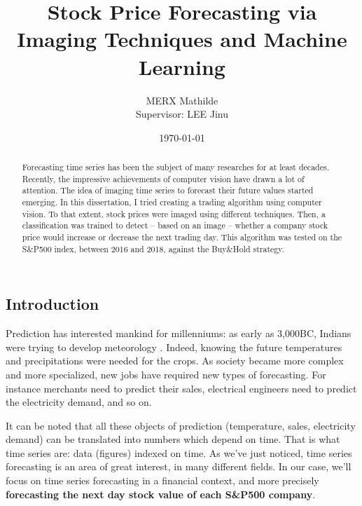 \documentclass[11pt]{article}
\begin{document}
\begin{onehalfspace}


\title{%
Stock Price Forecasting via Imaging Techniques and Machine Learning}
\date{{\today}}
\author{MERX Mathilde \\Supervisor: LEE Jinu}

\maketitle 

\pagebreak

\begin{abstract}
	Forecasting time series has been the subject of many researches for at least decades. Recently, the impressive achievements of computer vision have drawn a lot of attention. The idea of imaging time series to forecast their future values started emerging. In this dissertation, I tried creating a trading algorithm using computer vision. To that extent, stock prices were imaged using different techniques. Then, a classification was trained to detect -- based on an image -- whether a company stock price would increase or decrease the next trading day. This algorithm was tested on the S\&P500 index, between 2016 and 2018, against the Buy\&Hold strategy.
\end{abstract}

\pagebreak

\tableofcontents

\pagebreak

\section{Introduction}

Prediction has interested mankind for millenniums: as early as 3,000BC, Indians were trying to develop meteorology \cite{meteo}. Indeed, knowing the future temperatures and precipitations were needed for the crops. As society became more complex and more specialized, new jobs have required new types of forecasting. For instance merchants need to predict their sales, electrical engineers need to predict the electricity demand, and so on. 

It can be noted that all these objects of prediction (temperature, sales, electricity demand) can be translated into numbers which depend on time. That is what time series are: data (figures) indexed on time. As we've just noticed, time series forecasting is an area of great interest, in many different fields. In our case, we'll focus on time series forecasting in a financial context, and more precisely \textbf{forecasting the next day stock value of each S\&P500 company}.


\end{onehalfspace}
\end{document}
